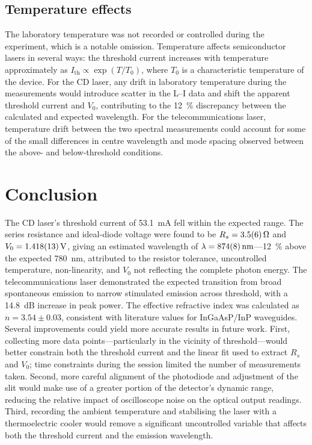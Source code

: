 \documentclass[a4paper, 10pt]{article}
\begin{document}
\subsection{Temperature effects}
The laboratory temperature was not recorded or controlled during the experiment, which is a notable omission. Temperature affects semiconductor lasers in several ways: the threshold current increases with temperature approximately as $I_\mathrm{th} \propto \exp(T/T_0)$, where $T_0$ is a characteristic temperature of the device. For the CD laser, any drift in laboratory temperature during the measurements would introduce scatter in the L--I data and shift the apparent threshold current and $V_0$, contributing to the \SI{12}{\percent} discrepancy between the calculated and expected wavelength. For the telecommunications laser, temperature drift between the two spectral measurements could account for some of the small differences in centre wavelength and mode spacing observed between the above- and below-threshold conditions.
\section{Conclusion}
The CD laser's threshold current of \SI{53.1}{\milli\ampere} fell within the expected range. The series resistance and ideal-diode voltage were found to be $R_s = \SI{3.5 +- 0.6}{\ohm}$ and $V_0 = \SI{1.418 +- 0.013}{\volt}$, giving an estimated wavelength of $\lambda = \SI{874 +- 8}{\nano\metre}$---\SI{12}{\percent} above the expected \SI{780}{\nano\metre}, attributed to the resistor tolerance, uncontrolled temperature, non-linearity, and $V_0$ not reflecting the complete photon energy. The telecommunications laser demonstrated the expected transition from broad spontaneous emission to narrow stimulated emission across threshold, with a \SI{14.8}{\deci\bel} increase in peak power. The effective refractive index was calculated as $n = 3.54 \pm 0.03$, consistent with literature values for InGaAsP/InP waveguides. Several improvements could yield more accurate results in future work. First, collecting more data points---particularly in the vicinity of threshold---would better constrain both the threshold current and the linear fit used to extract $R_s$ and $V_0$; time constraints during the session limited the number of measurements taken. Second, more careful alignment of the photodiode and adjustment of the slit would make use of a greater portion of the detector's dynamic range, reducing the relative impact of oscilloscope noise on the optical output readings. Third, recording the ambient temperature and stabilising the laser with a thermoelectric cooler would remove a significant uncontrolled variable that affects both the threshold current and the emission wavelength.
\end{document}
